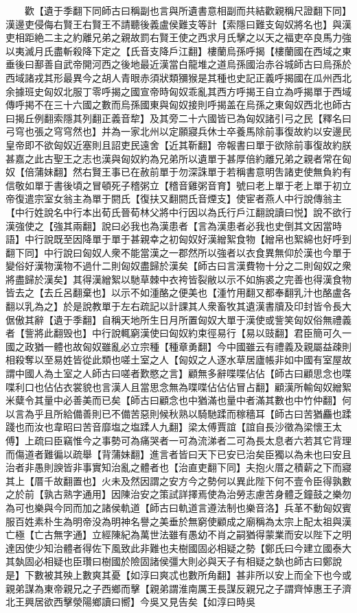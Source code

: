 　　歡【遺于季翻下同師古曰稱副也言與所遺書意相副而共結歡親稱尺證翻下同】漢邊吏侵侮右賢王右賢王不請聽後義盧侯難支等計【索隱曰難支匈奴將名也】與漢吏相距絶二主之約離兄弟之親故罰右賢王使之西求月氏擊之以天之福吏卒良馬力強以夷滅月氏盡斬殺降下定之【氏音支降戶江翻】樓蘭烏孫呼揭【樓蘭國在西域之東垂後曰鄯善自武帝開河西之後地最近漢當白龍堆之道烏孫國治赤谷城師古曰烏孫於西域諸戎其形最異今之胡人青眼赤須狀類獼猴是其種也史記正義呼揭國在瓜州西北余據班史匈奴北服丁零呼揭之國宣帝時匈奴乖亂其西方呼揭王自立為呼揭單于西域傳呼掲不在三十六國之數而烏孫國東與匈奴接則呼揭盖在烏孫之東匈奴西北也師古曰揭丘例翻索隱其列翻正義音犂】及其旁二十六國皆已為匈奴諸引弓之民【釋名曰弓穹也張之穹穹然也】并為一家北州以定願寢兵休士卒養馬除前事復故約以安邊民皇帝即不欲匈奴近塞則且詔吏民遠舍【近其靳翻】帝報書曰單于欲除前事復故約朕甚嘉之此古聖王之志也漢與匈奴約為兄弟所以遺單于甚厚倍約離兄弟之親者常在匈奴【倍蒲妹翻】然右賢王事已在赦前單于勿深誅單于若稱書意明吿諸吏使無負約有信敬如單于書後頃之冒頓死子稽粥立【稽音雞粥音育】號曰老上單于老上單于初立帝復遣宗室女翁主為單于閼氏【復扶又翻閼氏音煙支】使宦者燕人中行說傳翁主【中行姓說名中行本出荀氏晉荀林父將中行因以為氏行戶江翻說讀曰悦】說不欲行漢強使之【強其兩翻】說曰必我也為漢患者【言為漢患者必我也史倒其文因當時語】中行說既至因降單于單于甚親幸之初匈奴好漢繒絮食物【繒帛也絮綿也好呼到翻下同】中行說曰匈奴人衆不能當漢之一郡然所以強者以衣食異無仰於漢也今單于變俗好漢物漢物不過什二則匈奴盡歸於漢矣【師古曰言漢費物十分之二則匈奴之衆將盡歸於漢矣】其得漢繒絮以馳草棘中衣袴皆裂敝以示不如旃裘之完善也得漢食物皆去之【去丘呂翻棄也】以示不如湩酪之便美也【湩竹用翻又都奉翻乳汁也酪盧各翻以乳為之】於是說教單于左右疏記以計課其人衆畜牧其遺漢書牘及印封皆令長大倨傲其辭【遺于季翻】自稱天地所生日月所置匈奴大單于漢使或訾笑匈奴俗無禮義者【訾將此翻毁也】中行說輒窮漢使曰匈奴約束徑易行【易以豉翻】君臣簡可久一國之政猶一體也故匈奴雖亂必立宗種【種章勇翻】今中國雖云有禮義及親屬益疎則相殺奪以至易姓皆從此類也嗟土室之人【匈奴之人逐水草居廬帳非如中國有室屋故謂中國人為土室之人師古曰嗟者歎愍之言】顧無多辭喋喋佔佔【師古曰顧思念也喋喋利口也佔佔衣裳貌也言漢人且當思念無為喋喋佔佔佔冒占翻】顧漢所輸匈奴繒絮米糵令其量中必善美而已矣【師古曰顧念也中猶滿也量中者滿其數也中竹仲翻】何以言為乎且所給備善則已不備苦惡則候秋熟以騎馳蹂而稼穡耳【師古曰苦猶麤也蹂踐也而汝也韋昭曰苦音靡塩之塩蹂人九翻】梁太傅賈誼【誼自長沙徵為梁懷王太傅】上疏曰臣竊惟今之事勢可為痛哭者一可為流涕者二可為長太息者六若其它背理而傷道者難徧以疏舉【背蒲妹翻】進言者皆曰天下已安已治矣臣獨以為未也曰安且治者非愚則諛皆非事實知治亂之體者也【治直吏翻下同】夫抱火厝之積薪之下而寢其上【厝千故翻置也】火未及然因謂之安方今之勢何以異此陛下何不壹令臣得孰數之於前【孰古熟字通用】因陳治安之策試詳擇焉使為治勞志慮苦身體乏鐘鼓之樂勿為可也樂與今同而加之諸侯軌道【師古曰軌道言遵法制也樂音洛】兵革不動匈奴賓服百姓素朴生為明帝没為明神名譽之美垂於無窮使顧成之廟稱為太宗上配太祖與漢亡極【亡古無字通】立經陳紀為萬世法雖有愚幼不肖之嗣猶得蒙業而安以陛下之明達因使少知治體者得佐下風致此非難也夫樹國固必相疑之勢【鄭氏曰今建立國泰大其埶固必相疑也臣瓚曰樹國於險固諸侯彊大則必與天子有相疑之埶也師古曰鄭說是】下數被其殃上數爽其憂【如淳曰爽忒也數所角翻】甚非所以安上而全下也今或親弟謀為東帝親兄之子西鄉而擊【親弟謂淮南厲王長謀反親兄之子謂齊悼惠王子濟北王興居欲西擊滎陽鄉讀曰嚮】今吳又見告矣【如淳曰時吳